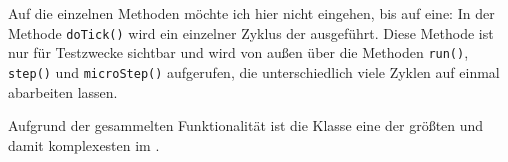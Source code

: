Auf die einzelnen Methoden möchte ich hier nicht eingehen, bis auf eine: In der Methode \texttt{doTick()} wird ein einzelner Zyklus der \mic ausgeführt. Diese Methode ist nur für Testzwecke sichtbar und wird von außen über die Methoden \texttt{run()}, \texttt{step()} und \texttt{microStep()} aufgerufen, die unterschiedlich viele Zyklen auf einmal abarbeiten lassen.

Aufgrund der gesammelten Funktionalität ist die Klasse  eine der größten und damit komplexesten im \md.